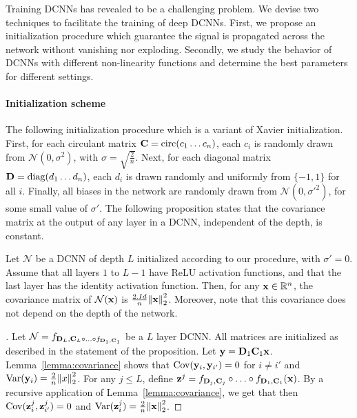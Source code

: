 Training DCNNs has revealed to be a challenging problem.
We devise two techniques to facilitate the training of deep DCNNs.
First, we propose an initialization procedure which guarantee the signal is propagated across the network without vanishing nor exploding.
Secondly, we study the behavior of DCNNs with different non-linearity functions and determine the best parameters for different settings. 

\paragraph{Initialization scheme}
The following initialization procedure which is a variant of Xavier initialization.
First, for each circulant matrix $\mathbf{C} = \mathrm{circ} (c_{1} \ldots c_{n})$, each $c_{i}$ is randomly drawn from $\mathcal{N} \left(0,\sigma^{2}\right)$, with $\sigma=\sqrt{\frac{2}{n}}$.
Next, for each diagonal matrix $\mathbf{D} = \mathrm{diag} (d_{1} \ldots d_{n})$, each $d_{i}$ is drawn randomly and uniformly from $\{-1,1\}$ for all $i$.
Finally, all biases in the network are randomly drawn from $\mathcal{N}\left(0,\sigma'^{2}\right)$, for some small value of $\sigma'$.
The following proposition states that the covariance matrix at the output of any layer in a DCNN, independent of the depth, is constant.

\begin{proposition} \label{proposition:initialization}
Let $\mathcal{N}$ be a DCNN of depth $L$ initialized according to our procedure, with $\sigma'=0$.
Assume that all layers $1$ to $L-1$ have ReLU activation functions, and that the last layer has the identity activation function.
Then, for any $\mathbf{x} \in {\ensuremath \mathbb{R}}^{n}$, the covariance matrix of $\mathcal{N}(\mathbf{x})$ is $\frac{2.Id}{n}\norm{\mathbf{x}}_{2}^{2}$.
Moreover, note that this covariance does not depend on the depth of the network.
\end{proposition}

\begin{proof}[]
Let $\mathcal{N} = f_{\mathbf{D}_{L}, \mathbf{C}_{L} \circ \ldots \circ f_{\mathbf{D}_{1}, \mathbf{C}_{1}}}$ be a $L$ layer DCNN.
All matrices are initialized as described in the statement of the proposition.
Let $\mathbf{y} = \mathbf{D}_{1} \mathbf{C}_{1} \mathbf{x}$.
Lemma~\ref{lemma:covariance} shows that $\mathrm{Cov}(\mathbf{y}_{i}, \mathbf{y}_{i'}) = 0$ for $i \neq i'$ and $\mathrm{Var}(\mathbf{y}_{i}) = \frac{2}{n}\norm{x}_{2}^{2}$.
For any $j \le L$, define $\mathbf{z}^j = f_{\mathbf{D}_j, \mathbf{C}_j} \circ \ldots \circ f_{\mathbf{D}_1, \mathbf{C}_1}(\mathbf{x})$.
By a recursive application of Lemma~\ref{lemma:covariance}, we get that then $\mathrm{Cov}(\mathbf{z}_i^j, \mathbf{z}_{i'}^j) = 0$ and $\mathrm{Var}(\mathbf{z}_i^j) = \frac{2}{n} \norm{\mathbf{x}}_2^2$.
\end{proof}

